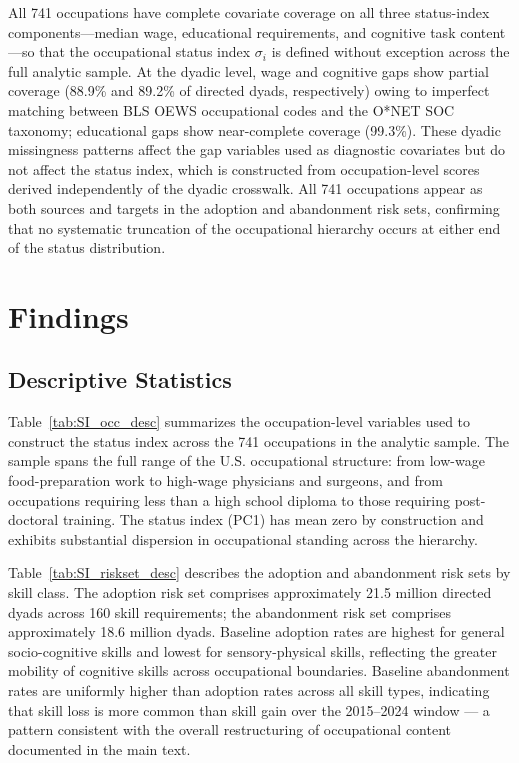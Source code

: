\documentclass[11pt, letterpaper]{article} %
\begin{document}
All 741 occupations have complete covariate coverage on all three status-index components---median wage, educational requirements, and cognitive task content---so that the occupational status index $\sigma_i$ is defined without exception across the full analytic sample. At the dyadic level, wage and cognitive gaps show partial coverage (88.9\% and 89.2\% of directed dyads, respectively) owing to imperfect matching between BLS OEWS occupational codes and the O*NET SOC taxonomy; educational gaps show near-complete coverage (99.3\%). These dyadic missingness patterns affect the gap variables used as diagnostic covariates but do not affect the status index, which is constructed from occupation-level scores derived independently of the dyadic crosswalk. All 741 occupations appear as both sources and targets in the adoption and abandonment risk sets, confirming that no systematic truncation of the occupational hierarchy occurs at either end of the status distribution.
 
\section{Findings}

\subsection{Descriptive Statistics}
\label{sec:SI_descriptives}
 
Table~\ref{tab:SI_occ_desc} summarizes the occupation-level variables used to construct the status index across the 741 occupations in the analytic sample. The sample spans the full range of the U.S. occupational structure: from low-wage food-preparation work to high-wage physicians and surgeons, and from occupations requiring less than a high school diploma to those requiring post-doctoral training. The status index (PC1) has mean zero by construction and exhibits substantial dispersion in occupational standing across the hierarchy.
 
Table~\ref{tab:SI_riskset_desc} describes the adoption and abandonment risk sets by skill class. The adoption risk set comprises approximately 21.5 million directed dyads across 160 skill requirements; the abandonment risk set comprises approximately 18.6 million dyads. Baseline adoption rates are highest for general socio-cognitive skills and lowest for sensory-physical skills, reflecting the greater mobility of cognitive skills across occupational boundaries. Baseline abandonment rates are uniformly higher than adoption rates across all skill types, indicating that skill loss is more common than skill gain over the 2015--2024 window — a pattern consistent with the overall restructuring of occupational content documented in the main text.
 
\end{document}

